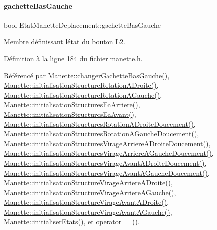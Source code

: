 \paragraph{\texorpdfstring{gachette\+Bas\+Gauche}{gachetteBasGauche}}
{\footnotesize\ttfamily bool Etat\+Manette\+Deplacement\+::gachette\+Bas\+Gauche}



Membre définissant l\textquotesingle{}état du bouton L2. 



Définition à la ligne \hyperlink{manette_8h_source_l00184}{184} du fichier \hyperlink{manette_8h_source}{manette.\+h}.



Référencé par \hyperlink{manette_8cpp_source_l00493}{Manette\+::changer\+Gachette\+Bas\+Gauche()}, \hyperlink{manette_8cpp_source_l00178}{Manette\+::initialisation\+Structure\+Rotation\+A\+Droite()}, \hyperlink{manette_8cpp_source_l00151}{Manette\+::initialisation\+Structure\+Rotation\+A\+Gauche()}, \hyperlink{manette_8cpp_source_l00127}{Manette\+::initialisation\+Structures\+En\+Arriere()}, \hyperlink{manette_8cpp_source_l00103}{Manette\+::initialisation\+Structures\+En\+Avant()}, \hyperlink{manette_8cpp_source_l00188}{Manette\+::initialisation\+Structures\+Rotation\+A\+Droite\+Doucement()}, \hyperlink{manette_8cpp_source_l00161}{Manette\+::initialisation\+Structures\+Rotation\+A\+Gauche\+Doucement()}, \hyperlink{manette_8cpp_source_l00296}{Manette\+::initialisation\+Structures\+Virage\+Arriere\+A\+Droite\+Doucement()}, \hyperlink{manette_8cpp_source_l00269}{Manette\+::initialisation\+Structures\+Virage\+Arriere\+A\+Gauche\+Doucement()}, \hyperlink{manette_8cpp_source_l00242}{Manette\+::initialisation\+Structures\+Virage\+Avant\+A\+Droite\+Doucement()}, \hyperlink{manette_8cpp_source_l00215}{Manette\+::initialisation\+Structures\+Virage\+Avant\+A\+Gauche\+Doucement()}, \hyperlink{manette_8cpp_source_l00286}{Manette\+::initialisation\+Structure\+Virage\+Arriere\+A\+Droite()}, \hyperlink{manette_8cpp_source_l00259}{Manette\+::initialisation\+Structure\+Virage\+Arriere\+A\+Gauche()}, \hyperlink{manette_8cpp_source_l00232}{Manette\+::initialisation\+Structure\+Virage\+Avant\+A\+Droite()}, \hyperlink{manette_8cpp_source_l00205}{Manette\+::initialisation\+Structure\+Virage\+Avant\+A\+Gauche()}, \hyperlink{manette_8cpp_source_l00023}{Manette\+::initialiser\+Etats()}, et \hyperlink{manette_8cpp_source_l00636}{operator==()}.

\mbox{\label{struct_etat_manette_deplacement_a8fa93da5af430ac00ffd4ee8b76987a2}} 
